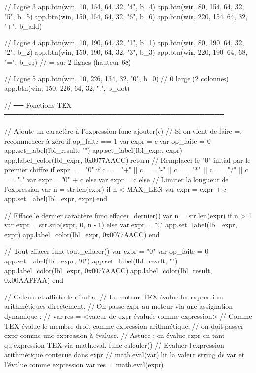 // Ligne 3
app.btn(win,  10, 154, 64, 32, "4", b_4)
app.btn(win,  80, 154, 64, 32, "5", b_5)
app.btn(win, 150, 154, 64, 32, "6", b_6)
app.btn(win, 220, 154, 64, 32, "+", b_add)

// Ligne 4
app.btn(win,  10, 190, 64, 32, "1", b_1)
app.btn(win,  80, 190, 64, 32, "2", b_2)
app.btn(win, 150, 190, 64, 32, "3", b_3)
app.btn(win, 220, 190, 64, 68, "=", b_eq)    // = sur 2 lignes (hauteur 68)

// Ligne 5
app.btn(win,  10, 226, 134, 32, "0", b_0)    // 0 large (2 colonnes)
app.btn(win, 150, 226,  64, 32, ".", b_dot)

// ── Fonctions TEX ─────────────────────────────────────────────

// Ajoute un caractère à l'expression
func ajouter(c)
    // Si on vient de faire =, recommencer à zéro
    if op_faite == 1 {
        var expr     = c
        var op_faite = 0
        app.set_label(lbl_result, "")
        app.set_label(lbl_expr, expr)
        app.label_color(lbl_expr, 0x0077AACC)
        return
    }
    // Remplacer le "0" initial par le premier chiffre
    if expr == "0" {
        if c == "+" || c == "-" || c == "*" || c == "/" || c == "." {
            var expr = "0" + c
        } else {
            var expr = c
        }
    } else {
        // Limiter la longueur de l'expression
        var n = str.len(expr)
        if n < MAX_LEN {
            var expr = expr + c
        }
    }
    app.set_label(lbl_expr, expr)
end

// Efface le dernier caractère
func effacer_dernier()
    var n = str.len(expr)
    if n > 1 {
        var expr = str.sub(expr, 0, n - 1)
    } else {
        var expr = "0"
    }
    app.set_label(lbl_expr, expr)
    app.label_color(lbl_expr, 0x0077AACC)
end

// Tout effacer
func tout_effacer()
    var expr     = "0"
    var op_faite = 0
    app.set_label(lbl_expr,   "0")
    app.set_label(lbl_result, "")
    app.label_color(lbl_expr,   0x0077AACC)
    app.label_color(lbl_result, 0x00AAFFAA)
end

// Calcule et affiche le résultat
// Le moteur TEX évalue les expressions arithmétiques directement.
// On passe expr au moteur via une assignation dynamique :
//   var res = <valeur de expr évaluée comme expression>
// Comme TEX évalue le membre droit comme expression arithmétique,
// on doit passer expr comme une expression à évaluer.
// Astuce : on évalue expr en tant qu'expression TEX via math.eval.
func calculer()
    // Evaluer l'expression arithmétique contenue dans expr
    // math.eval(var) lit la valeur string de var et l'évalue comme expression
    var res = math.eval(expr)

